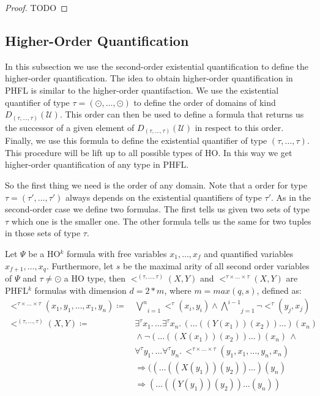 \begin{proof}
    TODO
\end{proof}

\subsection{Higher-Order Quantification}\label{subsec:higher-orderQuantification}

In this subsection we use the second-order existential quantification to define the higher-order
quantification. The idea to obtain higher-order quantification in PHFL is similar to the higher-order quantifaction.
We use the existential quantifier of type $\tau = (\odot, \dots, \odot)$ to define the order of domains of kind
$D_{(\tau, \dots, \tau)}(\mathcal{U})$. This order can then be used to define a formula that returns us the successor
of a given element of $D_{(\tau, \dots, \tau)}(\mathcal{U})$ in respect to this order. Finally, we use this
formula to define the existential quantifier of type $(\tau, \dots, \tau)$. This procedure will be lift up to all
possible types of HO. In this way we get higher-order quantification of any type in PHFL.

So the first thing we need is the order of any domain. Note that a order for type $\tau = (\tau', \dots, \tau')$ always
depends on the existential quantifiers of type $\tau'$. As in the second-order case we define two formulas. The first
tells us given two sets of type $\tau$ which one is the smaller one. The other formula tells us the same for two
tuples in those sets of type $\tau$.

\begin{definition}
    \label{definition:lower_bound_less_higher}
    Let $\Psi$ be a HO$^k$ formula with free variables $x_1, \dots, x_f$ and quantified variables $x_{f+1}, \dots,
    x_q$. Furthermore, let $s$ be the maximal arity of all second order variables of $\Psi$ and $\tau \neq \odot$ a HO
    type, then $<^{(\tau, \dots, \tau)}(X, Y)$ and $<^{\tau \times \dots \times \tau}(X, Y)$ are PHFL$^k$ formulas
    with dimension $d = 2 * m$, where $m = max({q, s})$, defined as:
    \begin{align*}
        <^{\tau \times \dots \times \tau}(x_1, y_1, \dots, x_1, y_n) \coloneqq &\,\underset{i =
        1}{\overset{n}{\bigvee}}<^{\tau}(x_i, y_i) \wedge \underset{j = 1}{\overset{i - 1}{\bigwedge}}
        \neg <^{\tau}(y_j, x_j)\\
        <^{(\tau, \dots, \tau)}(X, Y) \coloneqq &\,\exists^{\tau}x_1. \,\dots \exists^{\tau}x_n.\,(\dots((Y
        (x_1))(x_2))\dots) (x_n)\\
        &\,\wedge \neg (\dots((X(x_1))(x_2)) \dots)(x_n)\,\wedge \\&\,\forall^{\tau}y_1. \,\dots
        \forall^{\tau}y_n.\,<^{\tau \times \dots \times \tau}
        (y_1, x_1, \dots, y_n, x_n) \\&\,\Rightarrow ((\dots((X(y_1))(y_2)) \dots)(y_n) \\&\,\Rightarrow (\dots((Y(y_1))
        (y_2)) \dots(y_n))
    \end{align*}
\end{definition}

